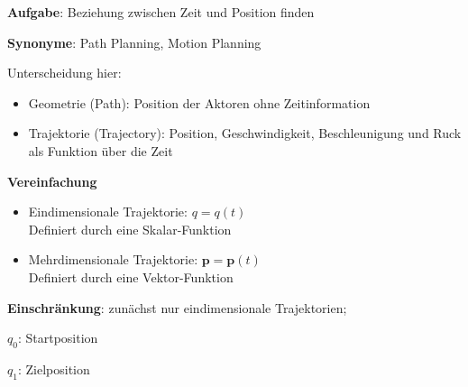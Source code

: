 { 

  \textbf{Aufgabe}: Beziehung zwischen Zeit und Position finden

  \textbf{Synonyme}: Path Planning, Motion Planning

  Unterscheidung hier:

  \begin{itemize}
    \item Geometrie (Path): Position der Aktoren ohne Zeitinformation
    \item Trajektorie (Trajectory): Position, Geschwindigkeit, Beschleunigung und Ruck als Funktion über die Zeit
  \end{itemize}

\textbf{Vereinfachung}

  \begin{itemize}
    \item Eindimensionale Trajektorie: $q=q(t)$
          \\Definiert durch eine Skalar-Funktion
    \item Mehrdimensionale Trajektorie: $\textbf{p}=\textbf{p}(t)$
          \\Definiert durch eine Vektor-Funktion
  \end{itemize}

  \textbf{Einschränkung}: zunächst nur eindimensionale Trajektorien; \cite{Piegl:1997}
}

{ 

  $q_0$: Startposition

  $q_1$: Zielposition

  \begin{figure}[!h]
    \centering
    
  \end{figure}
}

